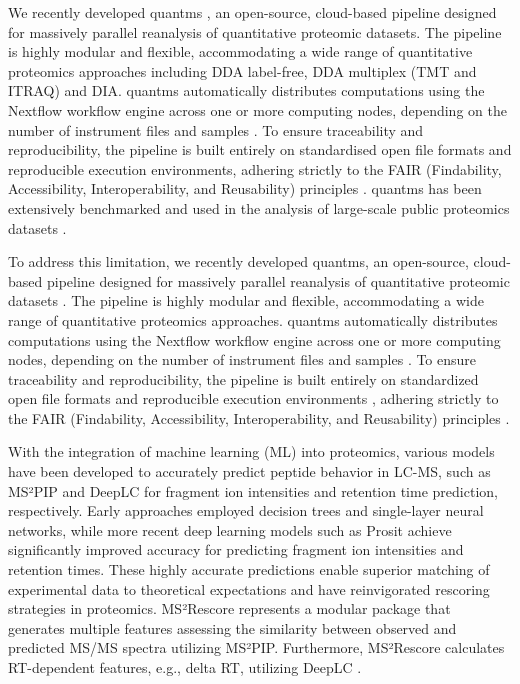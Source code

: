 \documentclass[12pt]{article}
\begin{document}
We recently developed quantms \cite{dai_quantms_2024}, an open-source, cloud-based pipeline designed for massively parallel reanalysis of quantitative proteomic datasets. The pipeline is highly modular and flexible, accommodating a wide range of quantitative proteomics approaches including DDA label-free, DDA multiplex (TMT and ITRAQ) and DIA. %
quantms automatically distributes computations using the Nextflow workflow engine across one or more computing nodes, depending on the number of instrument files and samples \cite{di_tommaso_nextflow_2017}. To ensure traceability and reproducibility, the pipeline is built entirely on standardised open file formats and reproducible execution environments, adhering strictly to the FAIR (Findability, Accessibility, Interoperability, and Reusability) principles \cite{wilkinson_fair_2016}. quantms has been extensively benchmarked and used in the analysis of large-scale public proteomics datasets \cite{dai_quantms_2024,bai2023lfq, ZHENG2025105440}.

To address this limitation, we recently developed quantms, an open-source, cloud-based pipeline designed for massively parallel reanalysis of quantitative proteomic datasets \cite{dai_quantms_2024}. The pipeline is highly modular and flexible, accommodating a wide range of quantitative proteomics approaches. quantms automatically distributes computations using the Nextflow workflow engine across one or more computing nodes, depending on the number of instrument files and samples \cite{di_tommaso_nextflow_2017}. To ensure traceability and reproducibility, the pipeline is built entirely on standardized open file formats and reproducible execution environments \cite{dai_proteomics_2021} \cite{martens_mzmlcommunity_2011}, adhering strictly to the FAIR (Findability, Accessibility, Interoperability, and Reusability) principles \cite{wilkinson_fair_2016}.

With the integration of machine learning (ML) into proteomics, various models have been developed to accurately predict peptide behavior in LC-MS, such as MS²PIP \cite{degroeve_ms2pip_2013} and DeepLC \cite{bouwmeester_deeplc_2021} for fragment ion intensities and retention time prediction, respectively. Early approaches employed decision trees and single-layer neural networks, while more recent deep learning models such as Prosit \cite{gessulat_prosit_2019} achieve significantly improved accuracy for predicting fragment ion intensities and retention times. These highly accurate predictions enable superior matching of experimental data to theoretical expectations and have reinvigorated rescoring strategies in proteomics. %
MS²Rescore represents a modular package that generates multiple features assessing the similarity between observed and predicted MS/MS spectra utilizing MS²PIP. Furthermore, MS²Rescore calculates RT-dependent features, e.g., delta RT, utilizing DeepLC \cite{buur_ms2_2024}.
\end{document}
